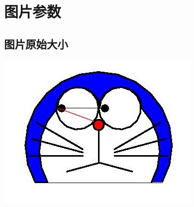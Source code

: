 \documentclass{article}
\begin{document}
\tableofcontents

\newpage

\section{图片参数}
\subsection{图片原始大小}

    \includegraphics{../LaTeX_Picture/doraemon1.jpg} 
\end{document}
